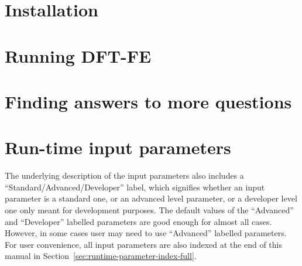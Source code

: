 \documentclass{article}
\newcommand{\dftfe}{\textsc{DFT-FE}}
\begin{document}
\section{Installation}
\label{sec:installation}


\section{Running \dftfe}
\label{sec:run}


%

\section{Finding answers to more questions}
\label{sec:questions-and-answers}


\appendix

\section{Run-time input parameters}
\label{sec:parameters}
The underlying description of the input parameters also includes a ``Standard/Advanced/Developer'' label, which signifies whether an input parameter is
a standard one, or an advanced level parameter, or a developer level one only meant for development purposes. The default values of the ``Advanced'' and ``Developer'' labelled parameters are good enough for almost all cases. However, in some cases user may need to use ``Advanced'' labelled parameters. For user convenience,
all input parameters are also indexed at the end of this manual in Section~\ref{sec:runtime-parameter-index-full}.



\pagebreak


\let\myRefname\refname
\renewcommand\refname{%
  \addcontentsline{toc}{section}{\numberline{}References}
  \myRefname
}




\pagebreak


\printindex[prmindexfull]
\end{document}
